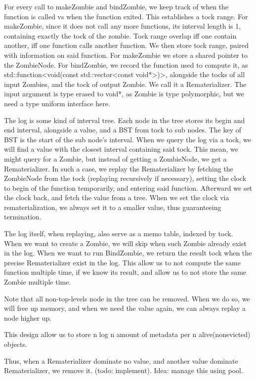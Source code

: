 For every call to makeZombie and bindZombie, we keep track of when the function is called vs when the function exited. This establishes a tock range. 
For makeZombie, since it does not call any more functions, its interval length is 1, containing exactly the tock of the zombie.
Tock range overlap iff one contain another, iff one function calls another function. We then store tock range, paired with information on said function. 
For makeZombie we store a shared pointer to the ZombieNode. 
For bindZombie, we record the function used to compute it, as std::function<void(const std::vector<const void*>)>, alongside the tocks of all input Zombies, and the tock of output Zombie. We call it a Rematerializer. The input argument is type erased to void*, as Zombie is type polymorphic, but we need a type uniform interface here.

The log is some kind of interval tree. Each node in the tree stores its begin and end interval, alongside a value, and a BST from tock to sub nodes. The key of BST is the start of the sub node’s interval. When we query the log via a tock, we will find a value with the closest interval containing said tock. This mean, we might query for a Zombie, but instead of getting a ZombieNode, we get a Rematerializer.
In such a case, we replay the Rematerializer by fetching the ZombieNode from the tock (replaying recursively if necessary), setting the clock to begin of the function temporarily, and entering said function. Afterward we set the clock back, and fetch the value from a tree.
When we set the clock via rematerialization, we always set it to a smaller value, thus guaranteeing termination.

The log itself, when replaying, also serve as a memo table, indexed by tock. When we want to create a Zombie, we will skip when such Zombie already exist in the log. When we want to run BindZombie, we return the result tock when the precise Rematerializer exist in the log. This allow us to not compute the same function multiple time, if we know its result, and allow us to not store the same Zombie multiple time.

Note that all non-top-levels node in the tree can be removed. When we do so, we will free up memory, and when we need the value again, we can always replay a node higher up.

This design allow us to store n log n amount of metadata per n alive(nonevicted) objects.

Thus, when a Rematerializer dominate no value, and another value dominate Rematerializer, we remove it. (todo: implement). Idea: manage this using pool.

